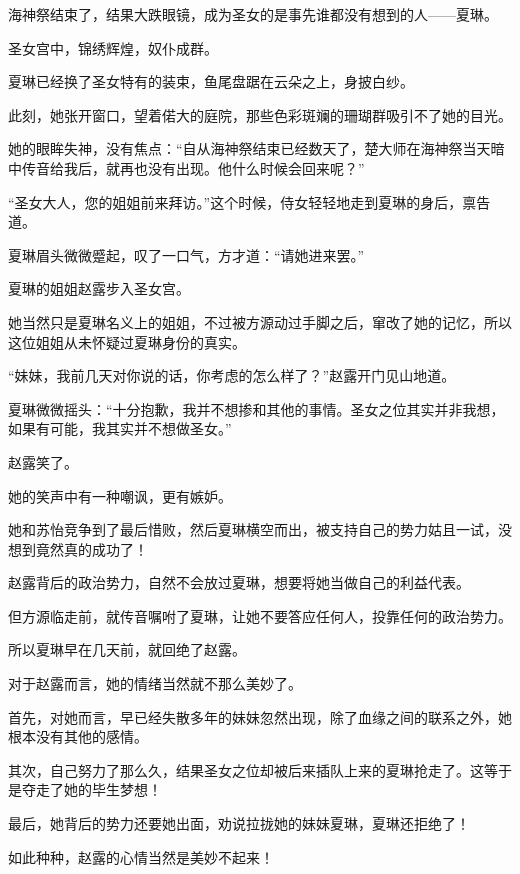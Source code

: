 
\begin{this_body}



海神祭结束了，结果大跌眼镜，成为圣女的是事先谁都没有想到的人——夏琳。

圣女宫中，锦绣辉煌，奴仆成群。

夏琳已经换了圣女特有的装束，鱼尾盘踞在云朵之上，身披白纱。

此刻，她张开窗口，望着偌大的庭院，那些色彩斑斓的珊瑚群吸引不了她的目光。

她的眼眸失神，没有焦点：“自从海神祭结束已经数天了，楚大师在海神祭当天暗中传音给我后，就再也没有出现。他什么时候会回来呢？”

“圣女大人，您的姐姐前来拜访。”这个时候，侍女轻轻地走到夏琳的身后，禀告道。

夏琳眉头微微蹙起，叹了一口气，方才道：“请她进来罢。”

夏琳的姐姐赵露步入圣女宫。

她当然只是夏琳名义上的姐姐，不过被方源动过手脚之后，窜改了她的记忆，所以这位姐姐从未怀疑过夏琳身份的真实。

“妹妹，我前几天对你说的话，你考虑的怎么样了？”赵露开门见山地道。

夏琳微微摇头：“十分抱歉，我并不想掺和其他的事情。圣女之位其实并非我想，如果有可能，我其实并不想做圣女。”

赵露笑了。

她的笑声中有一种嘲讽，更有嫉妒。

她和苏怡竞争到了最后惜败，然后夏琳横空而出，被支持自己的势力姑且一试，没想到竟然真的成功了！

赵露背后的政治势力，自然不会放过夏琳，想要将她当做自己的利益代表。

但方源临走前，就传音嘱咐了夏琳，让她不要答应任何人，投靠任何的政治势力。

所以夏琳早在几天前，就回绝了赵露。

对于赵露而言，她的情绪当然就不那么美妙了。

首先，对她而言，早已经失散多年的妹妹忽然出现，除了血缘之间的联系之外，她根本没有其他的感情。

其次，自己努力了那么久，结果圣女之位却被后来插队上来的夏琳抢走了。这等于是夺走了她的毕生梦想！

最后，她背后的势力还要她出面，劝说拉拢她的妹妹夏琳，夏琳还拒绝了！

如此种种，赵露的心情当然是美妙不起来！


\end{this_body}
